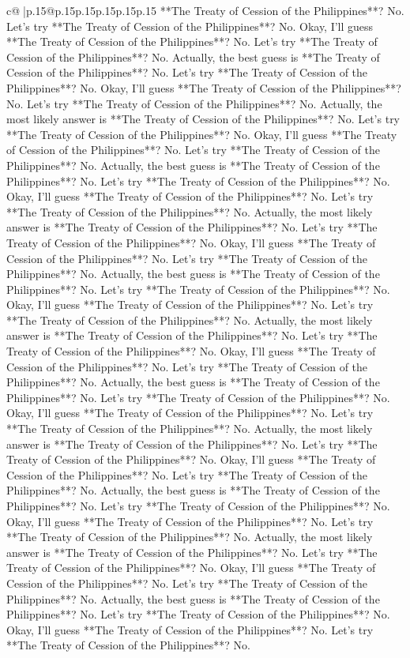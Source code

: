 \documentclass{article}
\begin{document}
{\begin{supertabular}{c@{$\;$}|p{.15\linewidth}@{}p{.15\linewidth}p{.15\linewidth}p{.15\linewidth}p{.15\linewidth}p{.15\linewidth}}
{{{**The Treaty of Cession of the Philippines**? No. Let's try **The Treaty of Cession of the Philippines**? No. Okay, I'll guess **The Treaty of Cession of the Philippines**? No. Let's try **The Treaty of Cession of the Philippines**? No. Actually, the best guess is **The Treaty of Cession of the Philippines**? No. Let's try **The Treaty of Cession of the Philippines**? No. Okay, I'll guess **The Treaty of Cession of the Philippines**? No. Let's try **The Treaty of Cession of the Philippines**? No. Actually, the most likely answer is **The Treaty of Cession of the Philippines**? No. Let's try **The Treaty of Cession of the Philippines**? No. Okay, I'll guess **The Treaty of Cession of the Philippines**? No. Let's try **The Treaty of Cession of the Philippines**? No. Actually, the best guess is **The Treaty of Cession of the Philippines**? No. Let's try **The Treaty of Cession of the Philippines**? No. Okay, I'll guess **The Treaty of Cession of the Philippines**? No. Let's try **The Treaty of Cession of the Philippines**? No. Actually, the most likely answer is **The Treaty of Cession of the Philippines**? No. Let's try **The Treaty of Cession of the Philippines**? No. Okay, I'll guess **The Treaty of Cession of the Philippines**? No. Let's try **The Treaty of Cession of the Philippines**? No. Actually, the best guess is **The Treaty of Cession of the Philippines**? No. Let's try **The Treaty of Cession of the Philippines**? No. Okay, I'll guess **The Treaty of Cession of the Philippines**? No. Let's try **The Treaty of Cession of the Philippines**? No. Actually, the most likely answer is **The Treaty of Cession of the Philippines**? No. Let's try **The Treaty of Cession of the Philippines**? No. Okay, I'll guess **The Treaty of Cession of the Philippines**? No. Let's try **The Treaty of Cession of the Philippines**? No. Actually, the best guess is **The Treaty of Cession of the Philippines**? No. Let's try **The Treaty of Cession of the Philippines**? No. Okay, I'll guess **The Treaty of Cession of the Philippines**? No. Let's try **The Treaty of Cession of the Philippines**? No. Actually, the most likely answer is **The Treaty of Cession of the Philippines**? No. Let's try **The Treaty of Cession of the Philippines**? No. Okay, I'll guess **The Treaty of Cession of the Philippines**? No. Let's try **The Treaty of Cession of the Philippines**? No. Actually, the best guess is **The Treaty of Cession of the Philippines**? No. Let's try **The Treaty of Cession of the Philippines**? No. Okay, I'll guess **The Treaty of Cession of the Philippines**? No. Let's try **The Treaty of Cession of the Philippines**? No. Actually, the most likely answer is **The Treaty of Cession of the Philippines**? No. Let's try **The Treaty of Cession of the Philippines**? No. Okay, I'll guess **The Treaty of Cession of the Philippines**? No. Let's try **The Treaty of Cession of the Philippines**? No. Actually, the best guess is **The Treaty of Cession of the Philippines**? No. Let's try **The Treaty of Cession of the Philippines**? No. Okay, I'll guess **The Treaty of Cession of the Philippines**? No. Let's try **The Treaty of Cession of the Philippines**? No. }}}
\end{supertabular}}
\end{document}
